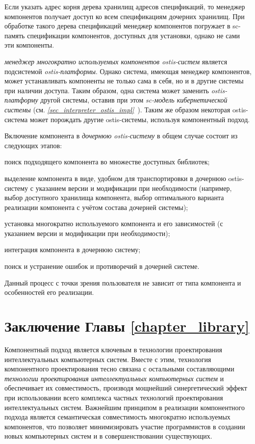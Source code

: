 Если указать адрес корня дерева хранилищ адресов спецификаций, то менеджер компонентов получает доступ ко всем спецификациям дочерних хранилищ. При обработке такого дерева спецификаций менеджер компонентов погружает в sc-память спецификации компонентов, доступных для установки, однако не сами эти компоненты.

\textit{менеджер многократно используемых компонентов ostis-систем} является  подсистемой \textit{ostis-платформы}. Однако система, имеющая менеджер компонентов, может устанавливать компоненты не только сама в себя, но и в другие системы при наличии доступа. Таким образом, одна система может заменить \textit{ostis-платформу} другой системы, оставив при этом \textit{sc-модель кибернетической системы} (см. \textit{\ref{sec_interpreter_ostis_impl}~}). Таким же образом некоторая ostis-система может порождать другие ostis-системы, используя компонентный подход.

Включение компонента в \textit{дочернюю ostis-систему} в общем случае состоит из следующих этапов:
\begin{textitemize}
	\item поиск подходящего компонента во множестве доступных библиотек;
	\item выделение компонента в виде, удобном для транспортировки в дочернюю ostis-систему с указанием версии и модификации при необходимости (например, выбор доступного хранилища компонента, выбор оптимального варианта реализации компонента с учётом состава дочерней системы);
	\item установка многократно используемого компонента и его зависимостей (с указанием версии и модификации при необходимости);
	\item интеграция компонента в дочернюю систему;
	\item поиск и устранение ошибок и противоречий в дочерней системе.
\end{textitemize}

Данный процесс с точки зрения пользователя не зависит от типа компонента и особенностей его реализации.

\section*{Заключение Главы \ref{chapter_library}}
\label{ostis_library_conclusion}

Компонентный подход является ключевым в технологии проектирования интеллектуальных компьютерных систем. Вместе с этим, технология компонентного проектирования тесно связана с остальными составляющими \textit{технологии проектирования интеллектуальных компьютерных систем} и обеспечивает их совместимость, производя мощнейший синергетический эффект при использовании всего комплекса частных технологий проектирования интеллектуальных систем. Важнейшим принципом в реализации компонентного подхода является семантическая совместимость многократно используемых компонентов, что позволяет минимизировать участие программистов в создании новых компьютерных систем и в совершенствовании существующих.

